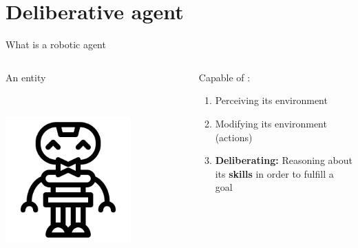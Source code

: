 \section{Deliberative agent}

\begin{frame}{What is a robotic agent}

    \begin{columns}[T]
        \begin{column}{0.3\textwidth}
            An entity

            ~

            \includegraphics[width = 0.7\textwidth]{images/icons8-robot-gustav-500.png}
        \end{column}
        \begin{column}{0.7\textwidth}
            \center Capable of :
            \pause
            \begin{enumerate}
                \item Perceiving its environment
                \pause
                \item Modifying its environment (actions)
                \pause
                \item \textbf{Deliberating:} Reasoning about its \textbf{skills} in order to fulfill a goal
            \end{enumerate}
        \end{column}
    \end{columns}

 
\end{frame}

